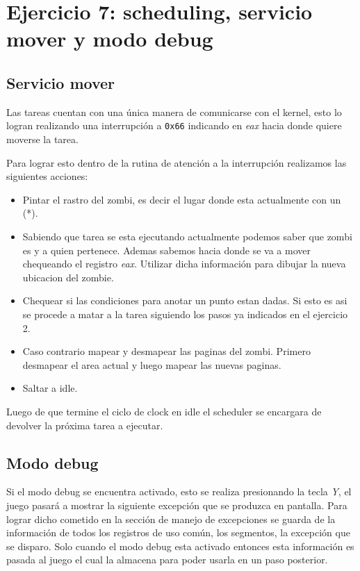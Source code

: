 \section{Ejercicio 7: scheduling, servicio mover y modo debug}


	\subsection{Servicio mover}
	Las tareas cuentan con una única manera de comunicarse con el kernel, esto lo logran realizando una interrupción a \texttt{0x66} indicando en \textit{eax} hacia donde quiere moverse la tarea.

	Para lograr esto dentro de la rutina de atención a la interrupción realizamos las siguientes acciones:

	\begin{itemize}
		\item Pintar el rastro del zombi, es decir el lugar donde esta actualmente con un (*).

		\item Sabiendo que tarea se esta ejecutando actualmente podemos saber que zombi es y a quien pertenece. Ademas sabemos hacia donde se va a mover chequeando el registro \textit{eax}. Utilizar dicha información para dibujar la nueva ubicacion del zombie.

		\item Chequear si las condiciones para anotar un punto estan dadas. Si esto es asi se procede a matar a la tarea siguiendo los pasos ya indicados en el ejercicio 2.

		\item Caso contrario mapear y desmapear las paginas del zombi. Primero desmapear el area actual y luego mapear las nuevas paginas.

		\item Saltar a idle.
	\end{itemize}

	Luego de que termine el ciclo de clock en idle el scheduler se encargara de devolver la próxima tarea a ejecutar.

	\subsection{Modo debug}
	Si el modo debug se encuentra activado, esto se realiza presionando la tecla \textit{Y}, el juego pasará a mostrar la siguiente excepción que se produzca en pantalla. Para lograr dicho cometido en la sección de manejo de excepciones se guarda de la información de todos los registros de uso común, los segmentos, la excepción que se disparo. Solo cuando el modo debug esta activado entonces esta información es pasada al juego el cual la almacena para poder usarla en un paso posterior.

